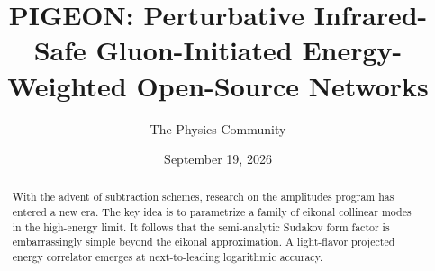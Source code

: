 \documentclass[11pt]{article}
\title{PIGEON: Perturbative Infrared-Safe Gluon-Initiated Energy-Weighted Open-Source Networks}
\author{The Physics Community}
\date{September 19, 2026}
\numberwithin{equation}{section}
\theoremstyle{definition}
\theoremstyle{remark}
\begin{document}
\maketitle
\begin{abstract}
With the advent of subtraction schemes, research on the amplitudes
program has entered a new era. The key idea is to parametrize a family
of eikonal collinear modes in the high-energy limit. It follows that the
semi-analytic Sudakov form factor is embarrassingly simple beyond the
eikonal approximation. A light-flavor projected energy correlator
emerges at next-to-leading logarithmic accuracy.
\end{abstract}
\tableofcontents





\nocite{*}


\end{document}
